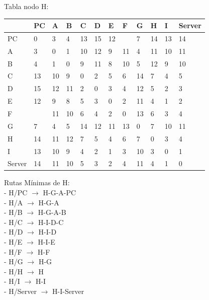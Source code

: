 \documentclass[a4paper]{article}
\begin{document}
\begin{table}[ht]
Tabla nodo H:\\
\begin{tabular}{|l|l|l|l|l|l|l|l|l|l|l|l|}
\hline
       & PC & A  & B & C & D & E & F & G & H & I  & Server \\ \hline
PC     & 0  & 3  & 4 & 13& 15& 12&   & 7 & 14& 13 & 14     \\ \hline
A      & 3  & 0  & 1 & 10& 12& 9 & 11& 4 & 11& 10 & 11     \\ \hline
B      & 4  & 1  & 0 & 9 & 11& 8 & 10& 5 & 12& 9  & 10     \\ \hline
C      & 13 & 10 & 9 & 0 & 2 & 5 & 6 & 14& 7 & 4  & 5      \\ \hline
D      & 15 & 12 & 11& 2 & 0 & 3 & 4 & 12& 5 & 2  & 3      \\ \hline
E      & 12 & 9  & 8 & 5 & 3 & 0 & 2 & 11& 4 & 1  & 2      \\ \hline
F      &    & 11 & 10& 6 & 4 & 2 & 0 & 13& 6 & 3  & 4      \\ \hline
G      & 7  & 4  & 5 & 14& 12& 11& 13& 0 & 7 & 10 & 11     \\ \hline
H      & 14 & 11 & 12& 7 & 5 & 4 & 6 & 7 & 0 & 3  & 4      \\ \hline
I      & 13 & 10 & 9 & 4 & 2 & 1 & 3 & 10& 3 & 0  & 1      \\ \hline
Server & 14 & 11 & 10& 5 & 3 & 2 & 4 & 11& 4 & 1  & 0      \\ \hline
\end{tabular}

Rutas Mínimas de H:\\
-	H/PC  $\rightarrow$  H-G-A-PC\\
-	H/A  $\rightarrow$  H-G-A\\
-	H/B  $\rightarrow$  H-G-A-B\\
-	H/C  $\rightarrow$  H-I-D-C\\
-	H/D  $\rightarrow$  H-I-D\\
-	H/E  $\rightarrow$  H-I-E\\
-	H/F  $\rightarrow$  H-F\\
-	H/G  $\rightarrow$  H-G\\
-	H/H  $\rightarrow$  H\\
-	H/I  $\rightarrow$  H-I\\
-	H/Server  $\rightarrow$  H-I-Server\\
\end{table}


\clearpage
\end{document}
